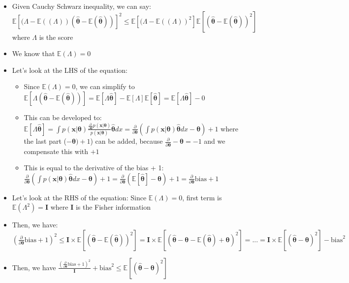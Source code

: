 \begin{itemize}
    \item Given Cauchy Schwarz inequality, we can say:
    $\mathbb{E}[ (\Lambda - \mathbb{E}((\Lambda)) (\hat{\boldsymbol{\theta}} - \mathbb{E}(\hat{\boldsymbol{\theta}})) ]^2 \leq \mathbb{E}[(\Lambda - \mathbb{E}((\Lambda))^2] \mathbb{E}[(\hat{\boldsymbol{\theta}} - \mathbb{E}(\hat{\boldsymbol{\theta}}))^2]$ where $\Lambda$ is the score
    \item We know that $\mathbb{E}(\Lambda) = 0$
    \item Let's look at the LHS of the equation:
    \begin{itemize}
        \item Since $\mathbb{E}(\Lambda) = 0$, we can simplify to $\mathbb{E}[ \Lambda (\hat{\boldsymbol{\theta}} - \mathbb{E}(\hat{\boldsymbol{\theta}})) ] = \mathbb{E}[ \Lambda \hat{\boldsymbol{\theta}}] - \mathbb{E}[\Lambda] \mathbb{E}[\hat{\boldsymbol{\theta}}] = \mathbb{E}[ \Lambda \hat{\boldsymbol{\theta}}] - 0$
        \item This can be developed to: $\mathbb{E}[ \Lambda \hat{\boldsymbol{\theta}}] = \int p( \boldsymbol{x} | \boldsymbol{\theta}) \frac{ \frac{\partial}{\partial \boldsymbol{\theta}} p( \boldsymbol{x} | \boldsymbol{\theta})}{ p( \boldsymbol{x} | \boldsymbol{\theta}) } \hat{\boldsymbol{\theta}} dx = \frac{\partial}{\partial \boldsymbol{\theta}} (\int p( \boldsymbol{x} | \boldsymbol{\theta}) \hat{\boldsymbol{\theta}} dx - \boldsymbol{\theta}) + 1$ where the last part ($- \boldsymbol{\theta}) + 1$) can be added, because $\frac{\partial}{\partial \boldsymbol{\theta}} -\boldsymbol{\theta} = -1$ and we compensate this with $+1$
        \item This is equal to the derivative of the bias + 1: $\frac{\partial}{\partial \boldsymbol{\theta}} (\int p( \boldsymbol{x} | \boldsymbol{\theta}) \hat{\boldsymbol{\theta}} dx - \boldsymbol{\theta}) + 1 = \frac{\partial}{\partial \boldsymbol{\theta}} (\mathbb{E}[\hat{\boldsymbol{\theta}}] - \boldsymbol{\theta}) + 1 = \frac{\partial}{\partial \boldsymbol{\theta}} \textrm{bias} + 1$
    \end{itemize}
    \item Let's look at the RHS of the equation: Since $\mathbb{E}(\Lambda) = 0$, first term is $\mathbb{E}(\Lambda^2) = \boldsymbol{I}$ where $\boldsymbol{I}$ is the Fisher information
    \item Then, we have: $(\frac{\partial}{\partial \boldsymbol{\theta}} \textrm{bias} + 1)^2 \leq \boldsymbol{I} \times \mathbb{E}[(\hat{\boldsymbol{\theta}}-\mathbb{E}(\hat{\boldsymbol{\theta}}))^2] = \boldsymbol{I} \times \mathbb{E}[(\hat{\boldsymbol{\theta}} - \boldsymbol{\theta} - \mathbb{E}(\hat{\boldsymbol{\theta}}) + \boldsymbol{\theta})^2] = ... = \boldsymbol{I} \times \mathbb{E}[(\hat{\boldsymbol{\theta}} - \boldsymbol{\theta})^2] - \textrm{bias}^2$
    \item Then, we have $\frac{(\frac{\partial}{\partial \boldsymbol{\theta}} \textrm{bias} + 1)^2}{\boldsymbol{I}} + \textrm{bias}^2 \leq \mathbb{E}[(\hat{\boldsymbol{\theta}}-\boldsymbol{\theta})^2]$
\end{itemize}

